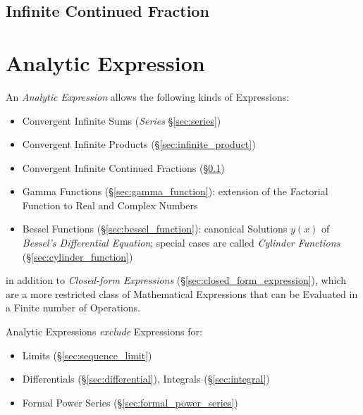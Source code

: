 \subsection{Infinite Continued Fraction}\label{sec:infinite_continued_fraction}



\section{Analytic Expression}\label{sec:analytic_expression}

An \emph{Analytic Expression} allows the following kinds of Expressions:
\begin{itemize}
  \item Convergent Infinite Sums (\emph{Series} \S\ref{sec:series})
  \item Convergent Infinite Products (\S\ref{sec:infinite_product})
  \item Convergent Infinite Continued Fractions
    (\S\ref{sec:infinite_continued_fraction})
  \item Gamma Functions (\S\ref{sec:gamma_function}): extension of the Factorial
    Function to Real and Complex Numbers
  \item Bessel Functions (\S\ref{sec:bessel_function}): canonical Solutions
    $y(x)$ of \emph{Bessel's Differential Equation}; special cases are called
    \emph{Cylinder Functions} (\S\ref{sec:cylinder_function})
\end{itemize}
in addition to \emph{Closed-form Expressions}
(\S\ref{sec:closed_form_expression}), which are a more restricted class of
Mathematical Expressions that can be Evaluated in a Finite number of Operations.

Analytic Expressions \emph{exclude} Expressions for:
\begin{itemize}
  \item Limits (\S\ref{sec:sequence_limit})
  \item Differentials (\S\ref{sec:differential}), Integrals
    (\S\ref{sec:integral})
  \item Formal Power Series (\S\ref{sec:formal_power_series})
\end{itemize}

